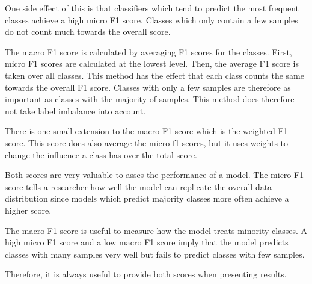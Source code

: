 One side effect of this is that classifiers which tend to predict the most frequent classes achieve a high micro F1 score. Classes which only contain a few samples do not count much towards the overall score.
\bigskip

The macro F1 score is calculated by averaging F1 scores for the classes. First, micro F1 scores are calculated at the lowest level. Then, the average F1 score is taken over all classes. This method has the effect that each class counts the same towards the overall F1 score. Classes with only a few samples are therefore as important as classes with the majority of samples. This method does therefore not take label imbalance into account.
\medskip

There is one small extension to the macro F1 score which is the weighted F1 score. This score does also average the micro f1 scores, but it uses weights to change the influence a class has over the total score.
\bigskip

Both scores are very valuable to asses the performance of a model. The micro F1 score tells a researcher how well the model can replicate the overall data distribution since models which predict majority classes more often achieve a higher score. 
\medskip

The macro F1 score is useful to measure how the model treats minority classes. A high micro F1 score and a low macro F1 score imply that the model predicts classes with many samples very well but fails to predict classes with few samples.

Therefore, it is always useful to provide both scores when presenting results.